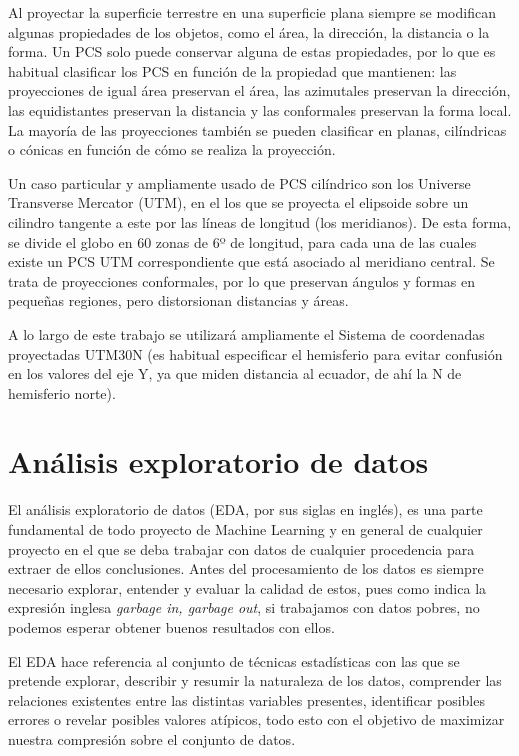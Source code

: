 \documentclass[12pt,a4paper,]{book}
\numberwithin{dummy}{section}
\theoremstyle{ocrenumbox}
\theoremstyle{blacknumex}
\theoremstyle{blacknumbox}
\theoremstyle{ocrenum}
\theoremstyle{ocrenum}
\begin{document}
Al proyectar la superficie terrestre en una superficie plana siempre se
modifican algunas propiedades de los objetos, como el área, la
dirección, la distancia o la forma. Un PCS solo puede conservar alguna
de estas propiedades, por lo que es habitual clasificar los PCS en
función de la propiedad que mantienen: las proyecciones de igual área
preservan el área, las azimutales preservan la dirección, las
equidistantes preservan la distancia y las conformales preservan la
forma local. La mayoría de las proyecciones también se pueden clasificar
en planas, cilíndricas o cónicas en función de cómo se realiza la
proyección.

Un caso particular y ampliamente usado de PCS cilíndrico son los
Universe Transverse Mercator (UTM), en el los que se proyecta el
elipsoide sobre un cilindro tangente a este por las líneas de longitud
(los meridianos). De esta forma, se divide el globo en 60 zonas de 6º de
longitud, para cada una de las cuales existe un PCS UTM correspondiente
que está asociado al meridiano central. Se trata de proyecciones
conformales, por lo que preservan ángulos y formas en pequeñas regiones,
pero distorsionan distancias y áreas.

A lo largo de este trabajo se utilizará ampliamente el Sistema de
coordenadas proyectadas UTM30N (es habitual especificar el hemisferio
para evitar confusión en los valores del eje Y, ya que miden distancia
al ecuador, de ahí la N de hemisferio norte).

\hypertarget{anuxe1lisis-exploratorio-de-datos}{%
\section{Análisis exploratorio de
datos}\label{anuxe1lisis-exploratorio-de-datos}}

El análisis exploratorio de datos (EDA, por sus siglas en inglés), es
una parte fundamental de todo proyecto de Machine Learning y en general
de cualquier proyecto en el que se deba trabajar con datos de cualquier
procedencia para extraer de ellos conclusiones. Antes del procesamiento
de los datos es siempre necesario explorar, entender y evaluar la
calidad de estos, pues como indica la expresión inglesa \emph{garbage
in, garbage out}, si trabajamos con datos pobres, no podemos esperar
obtener buenos resultados con ellos.

El EDA hace referencia al conjunto de técnicas estadísticas con las que
se pretende explorar, describir y resumir la naturaleza de los datos,
comprender las relaciones existentes entre las distintas variables
presentes, identificar posibles errores o revelar posibles valores
atípicos, todo esto con el objetivo de maximizar nuestra compresión
sobre el conjunto de datos.
\end{document}
